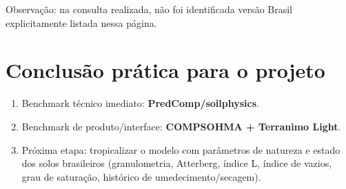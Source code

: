 \documentclass[12pt,a4paper]{article}
\newcommand{\Section}[1]{\needspace{12\baselineskip}\section{#1}}
\newenvironment{NoBreakEnumerate}
{\begin{samepage}\begin{enumerate}}
{\end{enumerate}\end{samepage}}
\begin{document}
Observação: na consulta realizada, não foi identificada versão Brasil explicitamente listada nessa página.

\Section{Conclusão prática para o projeto}
\begin{NoBreakEnumerate}
  \item Benchmark técnico imediato: \textbf{PredComp/soilphysics}.
  \item Benchmark de produto/interface: \textbf{COMPSOHMA + Terranimo Light}.
  \item Próxima etapa: tropicalizar o modelo com parâmetros de natureza e estado dos solos brasileiros (granulometria, Atterberg, índice L, índice de vazios, grau de saturação, histórico de umedecimento/secagem).
\end{NoBreakEnumerate}
\end{document}

